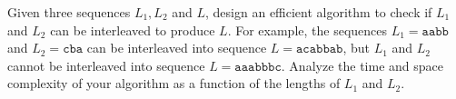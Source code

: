 \problem{}
Given three sequences $L_1, L_2$ and $L$, design an efficient algorithm to check if $L_1$ and $L_2$ can be interleaved to produce $L$.  For example, the sequences $L_1 = \texttt{aabb}$ and $L_2 = \texttt{cba}$ can be interleaved into sequence $L = \texttt{acabbab}$, but $L_1$ and $L_2$ cannot be interleaved into sequence $L = \texttt{aaabbbc}$.  Analyze the time and space complexity of your algorithm as a function of the lengths of $L_1$ and $L_2$.

\solution{}














\newpage